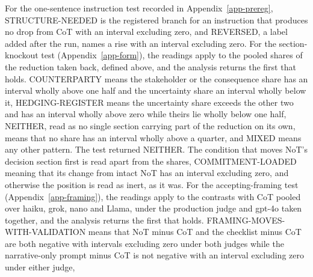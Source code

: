 For the one-sentence instruction test recorded in Appendix~\ref{app-prereg},
STRUCTURE-NEEDED is the registered branch for an instruction that produces no
drop from CoT with an interval excluding zero, and REVERSED, a label added
after the run, names a rise with an interval excluding zero.
For the section-knockout test (Appendix~\ref{app-form}), the readings apply
to the pooled shares of the reduction taken back, defined above, and the
analysis returns the first that holds. COUNTERPARTY means the stakeholder or
the consequence share has an interval wholly above one half and the
uncertainty share an interval wholly below it, HEDGING-REGISTER means the
uncertainty share exceeds the other two and has an interval wholly above zero
while theirs lie wholly below one half, NEITHER, read as no single section
carrying part of the reduction on its own, means that no share has an
interval wholly above a quarter, and MIXED means any other pattern. The test
returned NEITHER. The condition that moves NoT's decision section first is
read apart from the shares, COMMITMENT-LOADED meaning that its change from
intact NoT has an interval excluding zero, and otherwise the position is read
as inert, as it was.
For the accepting-framing test (Appendix~\ref{app-framing}), the readings
apply to the contrasts with CoT pooled over haiku, grok, nano and Llama,
under the production judge and gpt-4o taken together, and the analysis
returns the first that holds. FRAMING-MOVES-WITH-VALIDATION means that NoT
minus CoT and the checklist minus CoT are both negative with intervals
excluding zero under both judges while the narrative-only prompt minus CoT
is not negative with an interval excluding zero under either judge,
